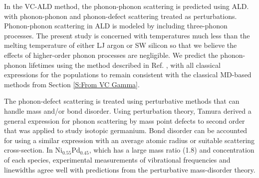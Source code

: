 In the VC-ALD method, the phonon-phonon scattering is  
predicted using ALD.\cite{turney_predicting_2009,esfarjani_heat_2011} 
with phonon-phonon and phonon-defect scattering treated as 
perturbations.
\cite{garg_role_2011,tian_phonon_2012,lindsay_thermal_2012} 
Phonon-phonon scattering in ALD is modeled by including three-phonon 
processes.\cite{turney_predicting_2009-1,garg_role_2011,tian_phonon_2012} 
The present study is concerned with temperatures much less than the 
melting temperature of either LJ argon
\cite{mcgaughey_phonon_2004} or 
SW silicon\cite{stillinger_computer_1985} so that we believe the effects 
of higher-order phonon processes are 
negligible.\cite{ecsedy_thermal_1977,turney_predicting_2009-1} 
We predict the phonon-phonon lifetimes using the method 
described in Ref. , 
with all classical expressions for the populations to remain 
consistent with the classical MD-based methods from 
Section \ref{S:From VC Gamma}. 




The phonon-defect scattering is treated 
using perturbative methods that can handle mass and/or bond disorder.
\cite{klemens_scattering_1955,klemens_thermal_1957,mattis_phonon_1957,
tamura_isotope_1983} 
Using perturbation theory, Tamura derived a general expression for 
phonon scattering by mass point defects to second order that was applied 
to study isotopic germanium.\cite{tamura_isotope_1983} Bond disorder 
can be accounted for using a similar expression with an average
atomic radius or suitable scattering cross-section.
\cite{klemens_scattering_1955,klemens_thermal_1957} 
In Ni$_{0.55}$Pd$_{0.45}$, 
which has a large mass ratio (1.8) and concentration of each species, 
experimental measurements of   
vibrational frequencies and linewidths agree well with 
predictions from the perturbative mass-disorder theory.
\cite{mattis_phonon_1957,kamitakahara_vibrations_1974,tamura_isotope_1983} 

